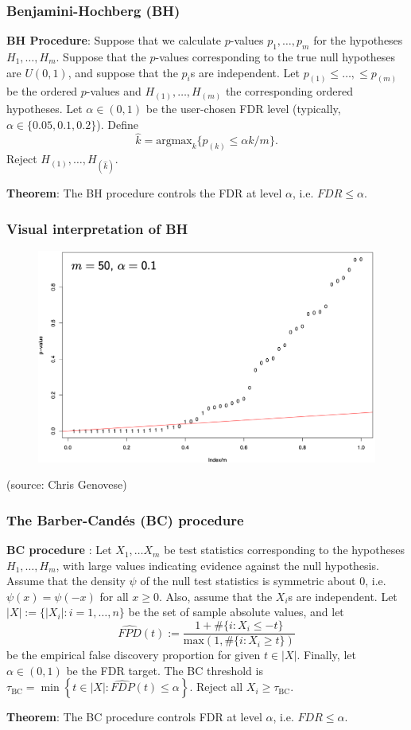 \documentclass{beamer}
\begin{document}
\begin{frame}
\frametitle{Benjamini-Hochberg (BH)}
\textbf{BH Procedure}: Suppose that we calculate $p$-values $p_1, \dots, p_m$ for the hypotheses $H_1, \dots, H_m$. Suppose that the $p$-values corresponding to the true null hypotheses are $U(0,1)$, and suppose that the $p_i$s are independent. Let $p_{(1)} \leq \dots, \leq p_{(m)}$ be the ordered $p$-values and $H_{(1)}, \dots, H_{(m)}$ the corresponding ordered hypotheses. Let $\alpha \in (0,1)$ be the user-chosen FDR level (typically, $\alpha \in \{ 0.05, 0.1, 0.2\}$). Define
$$\hat{k} = \textrm{argmax}_{k} \{ p_{(k)} \leq \alpha k /m \}.$$
Reject $H_{(1)}, \dots, H_{(\hat{k})}$.

\textbf{Theorem}: The BH procedure controls the FDR at level $\alpha$, i.e. $FDR \leq \alpha.$

\end{frame}

\begin{frame}
\frametitle{Visual interpretation of BH}

\begin{figure}
	\centering
	\includegraphics[width=1\linewidth]{bh_fig}
	\label{bhfig}
\end{figure}
(source: Chris Genovese)
\end{frame}

\begin{frame}
\frametitle{The Barber-Cand\'es (BC) procedure}
\textbf{BC procedure}  \parencite{Barber2015} : Let $X_1, \dots X_m$ be test statistics corresponding to the hypotheses $H_1, \dots, H_m$, with large values indicating evidence against the null hypothesis. Assume that the density $\psi$ of the null test statistics is symmetric about $0$, i.e. $\psi( x ) = \psi( -x )$ for all $x \geq 0$. Also, assume that the $X_i$s are independent. Let $|X| := \{ |X_i| : i = 1, \dots, n \}$ be the set of sample absolute values, and let $$\widehat{FPD}(t) := \frac{ 1 + \# \{ i:X_i \leq -t \} }{ \textrm{max} \left( 1, \# \{ i  : X_i \geq t \} \right) }$$ be the empirical false discovery proportion for given $t \in |X|.$ Finally, let $\alpha \in (0,1)$ be the FDR target. The BC threshold is $\tau_{\textrm{BC}} = \min \left\{ t \in |X| : \widehat{FDP}(t) \leq \alpha \right\}.$ Reject all $X_i \geq \tau_{\textrm{BC}}$.

\textbf{Theorem}: The BC procedure controls FDR at level $\alpha$, i.e. $FDR \leq \alpha$.
\end{frame}
\end{document}
